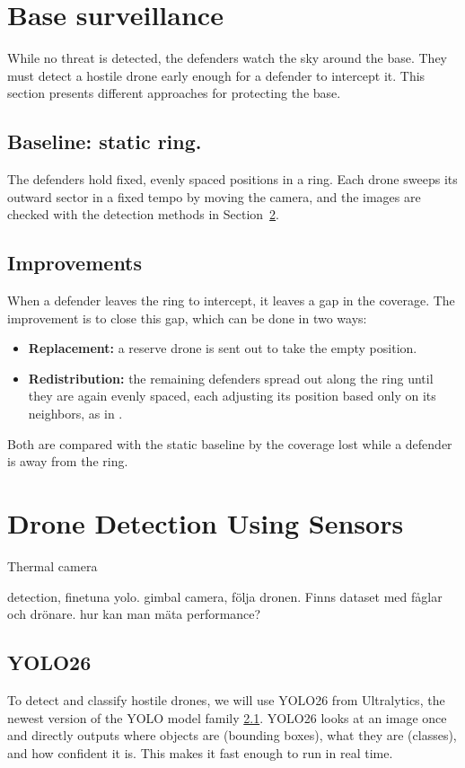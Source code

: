 \documentclass{article}
\begin{document}
\newpage
\section{Base surveillance} \label{sec:base_surveillance}
While no threat is detected, the defenders watch the sky around the base. They must detect a hostile drone early enough for a defender to intercept it. This section presents different approaches for protecting the base.
\subsection{Baseline: static ring.} The defenders hold fixed, evenly spaced
positions in a ring. Each drone sweeps its outward sector in a fixed tempo by moving the camera, and the images are checked with the detection methods in Section~\ref{sec:detection}.

\subsection{Improvements}
When a defender leaves the ring to intercept, it leaves a gap in the
coverage. The improvement is to close this gap, which can be done in two
ways:
\begin{itemize}
    \item \textbf{Replacement:} a reserve drone is         sent out to take the
          empty position.
    \item \textbf{Redistribution:} the remaining           defenders spread out along
          the ring until they are again evenly spaced, each adjusting its
          position based only on its neighbors, as in
          \cite{kingston2008perimeter}.
\end{itemize}
Both are compared with the static baseline by the coverage lost while a
defender is away from the ring.


\newpage
\section{Drone Detection Using Sensors}
\label{sec:detection}

Thermal camera

detection, finetuna yolo.
gimbal camera, följa dronen.
Finns dataset med fåglar och drönare.
hur kan man mäta performance?
\subsection{YOLO26}
To detect and classify hostile drones, we will use YOLO26 from Ultralytics, the newest version of the YOLO model family \ref{}. YOLO26 looks at an image once and directly outputs where objects are (bounding boxes), what they are (classes), and how confident it is. This makes it fast enough to run in real time.
\end{document}
